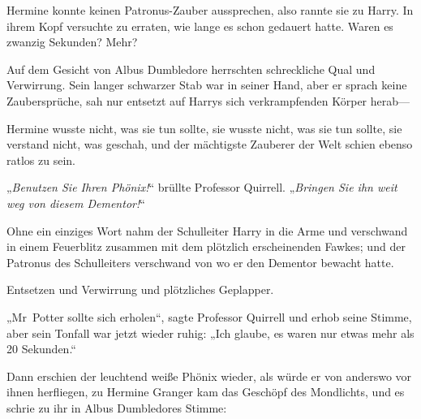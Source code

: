 Hermine konnte keinen Patronus-Zauber aussprechen, also rannte sie zu Harry. In ihrem Kopf versuchte zu erraten, wie lange es schon gedauert hatte. Waren es zwanzig Sekunden? Mehr?

Auf dem Gesicht von Albus Dumbledore herrschten schreckliche Qual und Verwirrung. Sein langer schwarzer Stab war in seiner Hand, aber er sprach keine Zaubersprüche, sah nur entsetzt auf Harrys sich verkrampfenden Körper herab—

Hermine wusste nicht, was sie tun sollte, sie wusste nicht, was sie tun sollte, sie verstand nicht, was geschah, und der mächtigste Zauberer der Welt schien ebenso ratlos zu sein.

„\emph{Benutzen Sie Ihren Phönix!}“ brüllte Professor Quirrell. „\emph{Bringen Sie ihn weit weg von diesem Dementor!}“

Ohne ein einziges Wort nahm der Schulleiter Harry in die Arme und verschwand in einem Feuerblitz zusammen mit dem plötzlich erscheinenden Fawkes; und der Patronus des Schulleiters verschwand von wo er den Dementor bewacht hatte.

Entsetzen und Verwirrung und plötzliches Geplapper.

„Mr~Potter sollte sich erholen“, sagte Professor Quirrell und erhob seine Stimme, aber sein Tonfall war jetzt wieder ruhig: „Ich glaube, es waren nur etwas mehr als 20 Sekunden.“

Dann erschien der leuchtend weiße Phönix wieder, als würde er von anderswo vor ihnen herfliegen, zu Hermine Granger kam das Geschöpf des Mondlichts, und es schrie zu ihr in Albus Dumbledores Stimme:

